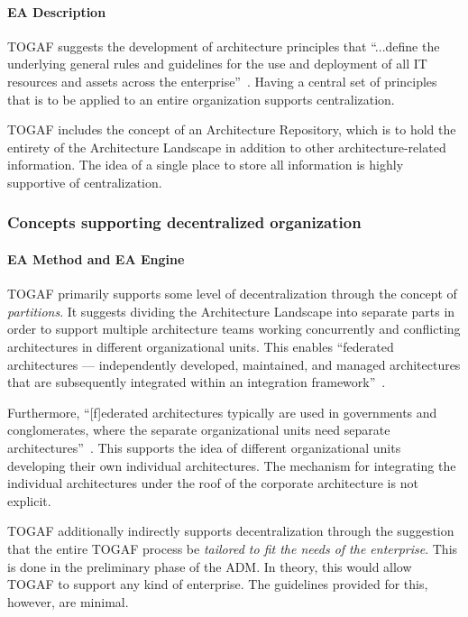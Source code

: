 \paragraph*{EA Description}
TOGAF suggests the development of architecture principles that ``...define the underlying general rules and guidelines for the use and deployment of all IT resources and assets across the enterprise''~\cite[Ch. 23]{togaf9.1}. Having a central set of principles that is to be applied to an entire organization supports centralization.

TOGAF includes the concept of an Architecture Repository, which is to hold the entirety of the Architecture Landscape in addition to other architecture-related information. The idea of a single place to store all information is highly supportive of centralization. 

\subsubsection{Concepts supporting decentralized organization}
\paragraph*{EA Method and EA Engine}
TOGAF primarily supports some level of decentralization through the concept of \textit{partitions}. It suggests dividing the Architecture Landscape into separate parts in order to support multiple architecture teams working concurrently and conflicting architectures in different organizational units. This enables ``federated architectures — independently developed, maintained, and managed architectures that are subsequently integrated within an integration framework''~\cite[Ch. 40.3]{togaf9.1}. 

Furthermore, ``[f]ederated architectures typically are used in governments and conglomerates, where the separate organizational units need separate architectures''~\cite[Ch. 40.3]{togaf9.1}. This supports the idea of different organizational units developing their own individual architectures. The mechanism for integrating the individual architectures under the roof of the corporate architecture is not explicit. 


TOGAF additionally indirectly supports decentralization through the suggestion that the entire TOGAF process be\textit{ tailored to fit the needs of the enterprise}. This is done in the preliminary phase of the ADM. In theory, this would allow TOGAF to support any kind of enterprise. The guidelines provided for this, however, are minimal. 


